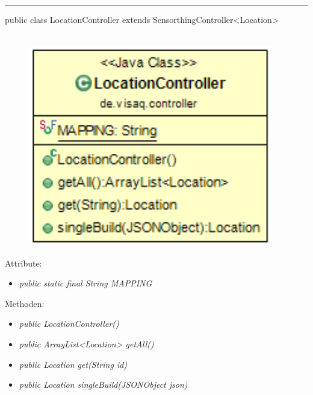 \rule{\textwidth}{0.4pt}
public class LocationController extends SensorthingController<Location>
\\\\
\begin{minipage}{0.4\textwidth}
    \begin{figure}[H]
        {\centering\includegraphics[width=0.95\textwidth]{media/backend/controller/classes/LocationController.png}}
    \end{figure}
    \end{minipage} \hfill
\begin{minipage}{0.6\textwidth}
\end{minipage}

Attribute:
\begin{itemize}
    \item \emph{public static final String MAPPING} \mappingDescription
\end{itemize}
Methoden:
\begin{itemize}
    \item \emph{public LocationController()}
    \item \emph{public ArrayList<Location> getAll()}
    \extendsSensorthingController
    \item \emph{public Location get(String id)}
    \extendsSensorthingController
    \item \emph{public Location singleBuild(JSONObject json)}
    \extendsSensorthingController
\end{itemize}

